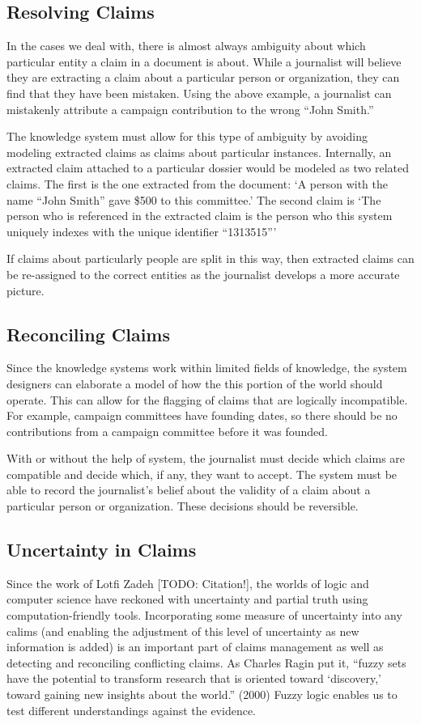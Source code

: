 \documentclass[format=siggraph, review=true]{acmart}
\begin{document}
\subsection{Resolving Claims}
In the cases we deal with, there is almost always ambiguity about
which particular entity a claim in a document is about. While a
journalist will believe they are extracting a claim about a particular
person or organization, they can find that they have been
mistaken. Using the above example, a journalist can mistakenly
attribute a campaign contribution to the wrong ``John Smith.''

The knowledge system must allow for this type of ambiguity by avoiding
modeling extracted claims as claims about particular
instances. Internally, an extracted claim attached to a particular
dossier would be modeled as two related claims. The first is the one
extracted from the document: `A person with the name ``John Smith''
gave \$500 to this committee.' The second claim is `The person who is
referenced in the extracted claim is the person who this system
uniquely indexes with the unique identifier ``1313515'''

If claims about particularly people are split in this way, then
extracted claims can be re-assigned to the correct entities as the
journalist develops a more accurate picture.


\subsection{Reconciling Claims}
Since the knowledge systems work within limited fields of knowledge,
the system designers can elaborate a model of how the this portion of
the world should operate. This can allow for the flagging of claims
that are logically incompatible. For example, campaign committees have
founding dates, so there should be no contributions from a campaign
committee before it was founded. 

With or without the help of system, the journalist must decide which
claims are compatible and decide which, if any, they want to
accept. The system must be able to record the journalist's belief about
the validity of a claim about a particular person or
organization. These decisions should be reversible.

\subsection{Uncertainty in Claims}
Since the work of Lotfi Zadeh [TODO: Citation!], the worlds of logic and computer science have reckoned with uncertainty and partial truth using computation-friendly tools. Incorporating some measure of uncertainty into any calims (and enabling the adjustment of this level of uncertainty as new information is added) is an important part of claims management as well as detecting and reconciling conflicting claims. As Charles Ragin put it, ``fuzzy sets have the potential to transform research that is oriented toward `discovery,' toward gaining new insights about the world.'' (2000) Fuzzy logic enables us to test different understandings against the evidence. 
\end{document}
